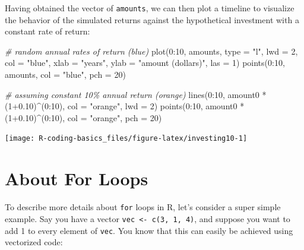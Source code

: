 \documentclass[
]{book}
\newenvironment{Shaded}{\begin{snugshade}}{\end{snugshade}}
\newcommand{\AttributeTok}[1]{\textcolor[rgb]{0.77,0.63,0.00}{#1}}
\newcommand{\CommentTok}[1]{\textcolor[rgb]{0.56,0.35,0.01}{\textit{#1}}}
\newcommand{\DecValTok}[1]{\textcolor[rgb]{0.00,0.00,0.81}{#1}}
\newcommand{\FloatTok}[1]{\textcolor[rgb]{0.00,0.00,0.81}{#1}}
\newcommand{\FunctionTok}[1]{\textcolor[rgb]{0.00,0.00,0.00}{#1}}
\newcommand{\NormalTok}[1]{#1}
\newcommand{\SpecialCharTok}[1]{\textcolor[rgb]{0.00,0.00,0.00}{#1}}
\newcommand{\StringTok}[1]{\textcolor[rgb]{0.31,0.60,0.02}{#1}}
\begin{document}
Having obtained the vector of \texttt{amounts}, we can then plot a timeline to
visualize the behavior of the simulated returns against the hypothetical
investment with a constant rate of return:

\begin{Shaded}
\begin{Highlighting}[]
\CommentTok{\# random annual rates of return (blue)}
\FunctionTok{plot}\NormalTok{(}\DecValTok{0}\SpecialCharTok{:}\DecValTok{10}\NormalTok{, amounts, }\AttributeTok{type =} \StringTok{"l"}\NormalTok{, }\AttributeTok{lwd =} \DecValTok{2}\NormalTok{, }\AttributeTok{col =} \StringTok{"blue"}\NormalTok{,}
     \AttributeTok{xlab =} \StringTok{"years"}\NormalTok{, }\AttributeTok{ylab =} \StringTok{"amount (dollars)"}\NormalTok{, }\AttributeTok{las =} \DecValTok{1}\NormalTok{)}
\FunctionTok{points}\NormalTok{(}\DecValTok{0}\SpecialCharTok{:}\DecValTok{10}\NormalTok{, amounts, }\AttributeTok{col =} \StringTok{"blue"}\NormalTok{, }\AttributeTok{pch =} \DecValTok{20}\NormalTok{)}

\CommentTok{\# assuming constant 10\% annual return (orange)}
\FunctionTok{lines}\NormalTok{(}\DecValTok{0}\SpecialCharTok{:}\DecValTok{10}\NormalTok{, amount0 }\SpecialCharTok{*}\NormalTok{ (}\DecValTok{1}\FloatTok{+0.10}\NormalTok{)}\SpecialCharTok{\^{}}\NormalTok{(}\DecValTok{0}\SpecialCharTok{:}\DecValTok{10}\NormalTok{), }\AttributeTok{col =} \StringTok{"orange"}\NormalTok{, }\AttributeTok{lwd =} \DecValTok{2}\NormalTok{)}
\FunctionTok{points}\NormalTok{(}\DecValTok{0}\SpecialCharTok{:}\DecValTok{10}\NormalTok{, amount0 }\SpecialCharTok{*}\NormalTok{ (}\DecValTok{1}\FloatTok{+0.10}\NormalTok{)}\SpecialCharTok{\^{}}\NormalTok{(}\DecValTok{0}\SpecialCharTok{:}\DecValTok{10}\NormalTok{), }\AttributeTok{col =} \StringTok{"orange"}\NormalTok{, }\AttributeTok{pch =} \DecValTok{20}\NormalTok{)}
\end{Highlighting}
\end{Shaded}

\begin{center}\texttt{[image: R-coding-basics\_files/figure-latex/investing10-1]} \end{center}

\hypertarget{about-for-loops}{%
\section{About For Loops}\label{about-for-loops}}

To describe more details about \texttt{for} loops in R, let's consider a super simple
example. Say you have a vector \texttt{vec\ \textless{}-\ c(3,\ 1,\ 4)}, and suppose you want to add
1 to every element of \texttt{vec}. You know that this can easily be achieved using
vectorized code:
\end{document}
